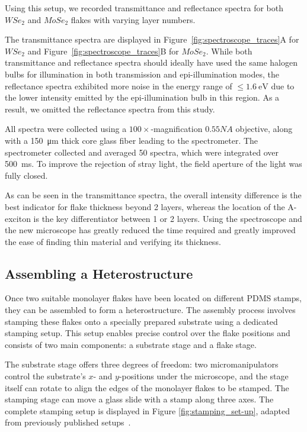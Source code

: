 \vspace{1cm}

Using this setup, we recorded transmittance and reflectance spectra for both $WSe_2$ and $MoSe_2$ flakes with varying layer numbers.



The transmittance spectra are displayed in Figure~\ref{fig:spectroscope_traces}A for $WSe_2$ and Figure~\ref{fig:spectroscope_traces}B for $MoSe_2$. 
%
While both transmittance and reflectance spectra should ideally have used the same halogen bulbs for illumination in both transmission and epi-illumination modes, the reflectance spectra exhibited more noise in the energy range of $\leq \SI{1.6}{\electronvolt}$ due to the lower intensity emitted by the epi-illumination bulb in this region. As a result, we omitted the reflectance spectra from this study.

All spectra were collected using a $100\times$-magnification $0.55NA$ objective, along with a \SI{150}{\micro\meter} thick core glass fiber leading to the spectrometer. 
%
The spectrometer collected and averaged 50 spectra, which were integrated over \SI{500}{\milli\second}. To improve the rejection of stray light, the field aperture of the light was fully closed.

As can be seen in the transmittance spectra, the overall intensity difference is the best indicator for flake thickness beyond 2 layers, whereas the location of the A-exciton is the key differentiator between 1 or 2 layers. 
%
Using the spectroscope and the new microscope has greatly reduced the time required and greatly improved the ease of finding thin material and verifying its thickness.

\subsection{Assembling a Heterostructure}
%
Once two suitable monolayer flakes have been located on different PDMS stamps, they can be assembled to form a heterostructure.
%
The assembly process involves stamping these flakes onto a specially prepared substrate using a dedicated stamping setup.
%
This setup enables precise control over the flake positions and consists of two main components: a substrate stage and a flake stage.

The substrate stage offers three degrees of freedom: two micromanipulators control the substrate's $x$- and $y$-positions under the microscope, and the stage itself can rotate to align the edges of the monolayer flakes to be stamped.
%
The stamping stage can move a glass slide with a stamp along three axes.
%
The complete stamping setup is displayed in Figure \ref{fig:stamping_set-up}, adapted  from previously published setups~\cite{castellanos-gomezDeterministicTransferTwodimensional2014, castellanos-gomezDeterministicTransferTwodimensional2014a}.

